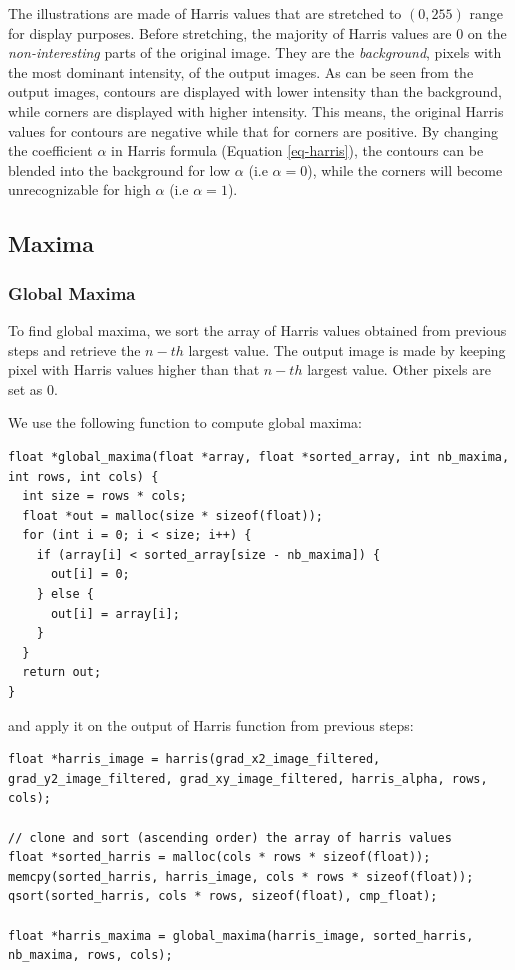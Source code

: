 \documentclass[a4paper, 10pt]{article}
\begin{document}
The illustrations are made of Harris values that are stretched to $(0, 255)$ range for display purposes. Before stretching, the majority of Harris values are $0$ on the \textit{non-interesting} parts of the original image. They are the \textit{background}, pixels with the most dominant intensity, of the output images. As can be seen from the output images, contours are displayed with lower intensity than the background, while corners are displayed with higher intensity. This means, the original Harris values for contours are negative while that for corners are positive. By changing the coefficient $\alpha$ in Harris formula (Equation \ref{eq-harris}), the contours can be blended into the background for low $\alpha$ (i.e $\alpha=0$), while the corners will become unrecognizable for high $\alpha$ (i.e $\alpha=1$).

\subsection{Maxima}
\subsubsection{Global Maxima}
To find global maxima, we sort the array of Harris values obtained from previous steps and retrieve the $n-th$ largest value. The output image is made by keeping pixel with Harris values higher than that $n-th$ largest value. Other pixels are set as 0.

We use the following function to compute global maxima:
\begin{lstlisting}[frame=single]
float *global_maxima(float *array, float *sorted_array, int nb_maxima, int rows, int cols) {
  int size = rows * cols;
  float *out = malloc(size * sizeof(float));
  for (int i = 0; i < size; i++) {
    if (array[i] < sorted_array[size - nb_maxima]) {
      out[i] = 0;
    } else {
      out[i] = array[i];
    }
  }
  return out;
}
\end{lstlisting}

and apply it on the output of Harris function from previous steps:
\begin{lstlisting}[frame=single]
float *harris_image = harris(grad_x2_image_filtered, grad_y2_image_filtered, grad_xy_image_filtered, harris_alpha, rows, cols);

// clone and sort (ascending order) the array of harris values
float *sorted_harris = malloc(cols * rows * sizeof(float));
memcpy(sorted_harris, harris_image, cols * rows * sizeof(float));
qsort(sorted_harris, cols * rows, sizeof(float), cmp_float);

float *harris_maxima = global_maxima(harris_image, sorted_harris, nb_maxima, rows, cols);
\end{lstlisting}
\end{document}
